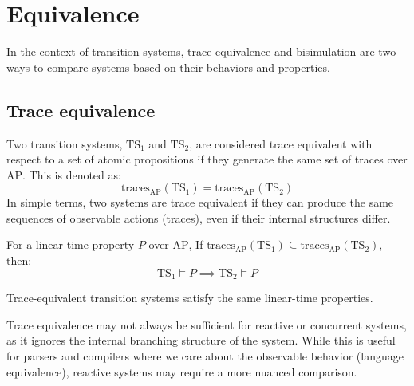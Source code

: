 \section{Equivalence}

In the context of transition systems, trace equivalence and bisimulation are two ways to compare systems based on their behaviors and properties.

\subsection{Trace equivalence}
Two transition systems, $\text{TS}_1$ and $\text{TS}_2$, are considered trace equivalent with respect to a set of atomic propositions if they generate the same set of traces over $\text{AP}$. 
This is denoted as:
\[\text{traces}_{\text{AP}}(\text{TS}_1)=\text{traces}_{\text{AP}}(\text{TS}_2)\]
\noindent In simple terms, two systems are trace equivalent if they can produce the same sequences of observable actions (traces), even if their internal structures differ.
\begin{theorem}
    For a linear-time property $P$ over $\text{AP}$, If $\text{traces}_{\text{AP}}(\text{TS}_1)\subseteq\text{traces}_{\text{AP}}(\text{TS}_2)$, then: 
    \[\text{TS}_1\models P \implies \text{TS}_2\models P\]
\end{theorem}
\begin{corollary}
    Trace-equivalent transition systems satisfy the same linear-time properties.
\end{corollary}
\noindent Trace equivalence may not always be sufficient for reactive or concurrent systems, as it ignores the internal branching structure of the system. 
While this is useful for parsers and compilers where we care about the observable behavior (language equivalence), reactive systems may require a more nuanced comparison.

